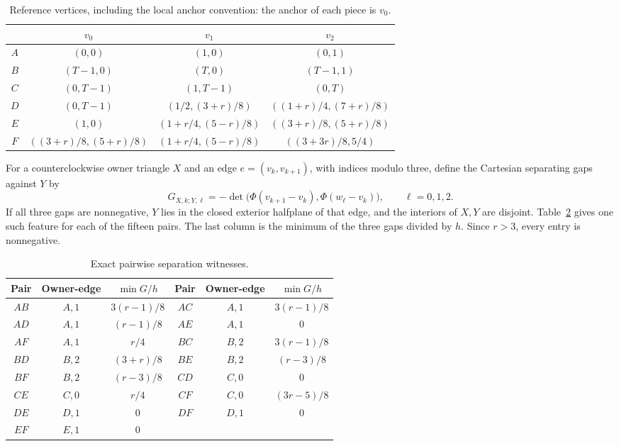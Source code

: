 \documentclass[11pt]{article}
\begin{document}
\begin{table}[htbp]
\centering
\small
\begin{tabular}{c c c c}
\hline
 & $v_0$ & $v_1$ & $v_2$\\\hline
$A$ & $(0,0)$ & $(1,0)$ & $(0,1)$\\
$B$ & $(T-1,0)$ & $(T,0)$ & $(T-1,1)$\\
$C$ & $(0,T-1)$ & $(1,T-1)$ & $(0,T)$\\
$D$ & $(0,T-1)$ & $(1/2,(3+r)/8)$ & $((1+r)/4,(7+r)/8)$\\
$E$ & $(1,0)$ & $(1+r/4,(5-r)/8)$ & $((3+r)/8,(5+r)/8)$\\
$F$ & $((3+r)/8,(5+r)/8)$ & $(1+r/4,(5-r)/8)$ & $((3+3r)/8,5/4)$\\\hline
\end{tabular}
\caption{Reference vertices, including the local anchor convention: the anchor of each piece is $v_0$.}\label{tab:vertices}
\end{table}

For a counterclockwise owner triangle $X$ and an edge $e=(v_k,v_{k+1})$, with indices modulo three, define the Cartesian separating gaps against $Y$ by
\begin{equation}\label{eq:gap}
 G_{X,k;Y,\ell}
 =-\det\bigl(\Phi(v_{k+1}-v_k),\Phi(w_\ell-v_k)\bigr),
 \qquad \ell=0,1,2.
\end{equation}
If all three gaps are nonnegative, $Y$ lies in the closed exterior halfplane of that edge, and the interiors of $X,Y$ are disjoint. Table~\ref{tab:separation} gives one such feature for each of the fifteen pairs. The last column is the minimum of the three gaps divided by $h$. Since $r>3$, every entry is nonnegative.

\begin{table}[htbp]
\centering
\small
\begin{tabular}{c c c@{\qquad}c c c}
\hline
Pair & Owner-edge & $\min G/h$ & Pair & Owner-edge & $\min G/h$\\\hline
$AB$ & $A,1$ & $3(r-1)/8$ & $AC$ & $A,1$ & $3(r-1)/8$\\
$AD$ & $A,1$ & $(r-1)/8$ & $AE$ & $A,1$ & $0$\\
$AF$ & $A,1$ & $r/4$ & $BC$ & $B,2$ & $3(r-1)/8$\\
$BD$ & $B,2$ & $(3+r)/8$ & $BE$ & $B,2$ & $(r-3)/8$\\
$BF$ & $B,2$ & $(r-3)/8$ & $CD$ & $C,0$ & $0$\\
$CE$ & $C,0$ & $r/4$ & $CF$ & $C,0$ & $(3r-5)/8$\\
$DE$ & $D,1$ & $0$ & $DF$ & $D,1$ & $0$\\
$EF$ & $E,1$ & $0$ & & &\\\hline
\end{tabular}
\caption{Exact pairwise separation witnesses.}\label{tab:separation}
\end{table}
\end{document}
